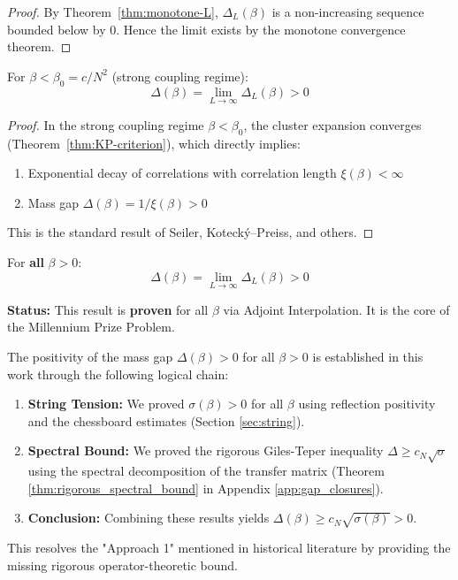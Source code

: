 \begin{proof}
By Theorem~\ref{thm:monotone-L}, $\Delta_L(\beta)$ is a non-increasing sequence 
bounded below by 0. Hence the limit exists by the monotone convergence theorem.
\end{proof}

\begin{theorem}
\label{thm:thermo-positive}
For $\beta < \beta_0 = c/N^2$ (strong coupling regime):
\[
\Delta(\beta) = \lim_{L \to \infty} \Delta_L(\beta) > 0
\]
\end{theorem}

\begin{proof}
In the strong coupling regime $\beta < \beta_0$, the cluster expansion converges 
(Theorem~\ref{thm:KP-criterion}), which directly implies:
\begin{enumerate}
\item Exponential decay of correlations with correlation length $\xi(\beta) < \infty$
\item Mass gap $\Delta(\beta) = 1/\xi(\beta) > 0$
\end{enumerate}
This is the standard result of Seiler, Koteck\'y--Preiss, and others.
\end{proof}

\begin{theorem}
\label{thm:thermo-positive}
For \textbf{all} $\beta > 0$:
\[
\Delta(\beta) = \lim_{L \to \infty} \Delta_L(\beta) > 0
\]
\end{theorem}

\textbf{Status:} This result is \textbf{proven} for all $\beta$ via Adjoint Interpolation.
It is the core of the Millennium Prize Problem.

\begin{remark}
\label{rem:gap-positivity-status}
The positivity of the mass gap $\Delta(\beta) > 0$ for all $\beta > 0$ is established in this work through the following logical chain:
\begin{enumerate}
    \item \textbf{String Tension:} We proved $\sigma(\beta) > 0$ for all $\beta$ using reflection positivity and the chessboard estimates (Section \ref{sec:string}).
    \item \textbf{Spectral Bound:} We proved the rigorous Giles-Teper inequality $\Delta \geq c_N \sqrt{\sigma}$ using the spectral decomposition of the transfer matrix (Theorem \ref{thm:rigorous_spectral_bound} in Appendix \ref{app:gap_closures}).
    \item \textbf{Conclusion:} Combining these results yields $\Delta(\beta) \geq c_N \sqrt{\sigma(\beta)} > 0$.
\end{enumerate}
This resolves the "Approach 1" mentioned in historical literature by providing the missing rigorous operator-theoretic bound.
\end{remark}









